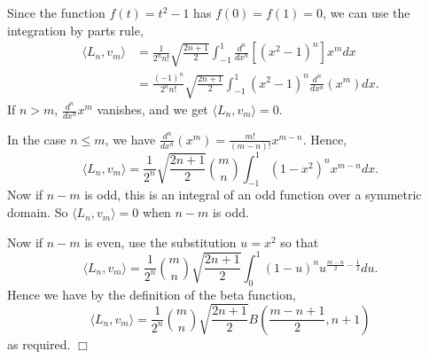 \documentclass[10pt]{article}
\newenvironment{proof}[1][Proof]{\begin{trivlist}
\item[\hskip \labelsep {\bfseries #1}]}{\end{trivlist}}
\begin{document}
        \begin{proof}
            Since the function $f(t) = t^2-1$ has $f(0) = f(1) = 0$, we can use the integration
            by parts rule,
            \begin{align*}
                \langle L_n,v_m\rangle &= \frac{1}{2^nn!}\sqrt{\frac{2n+1}{2}}\int_{-1}^1\frac{d^n}{dx^n}[(x^2-1)^n]x^mdx\\
                &= \frac{(-1)^n}{2^n n!}\sqrt{\frac{2n+1}{2}}\int_{-1}^1(x^2-1)^n\frac{d^n}{dx^n}(x^m)dx.
            \end{align*}
            If $n > m$, $\frac{d^n}{dx^n}x^m$ vanishes, and we get $\langle L_n,v_m\rangle = 0$. 
            
            In the case $n \leq m$, we have $\frac{d^n}{dx^n}(x^m) = \frac{m!}{(m-n)!}x^{m-n}$. Hence,
            \begin{equation*}
                \langle L_n,v_m\rangle = \frac{1}{2^n}\sqrt{\frac{2n+1}{2}}{m\choose n} \int_{-1}^1(1-x^2)^nx^{m-n}dx.
            \end{equation*}
            Now if $n-m$ is odd, this is an integral of an odd function over a symmetric
            domain. So $\langle L_n,v_m\rangle = 0$ when $n-m$ is odd.
            
            Now if $n-m$ is even,  use the substitution $u = x^2$ so that
            \begin{equation*}
                \langle L_n,v_m\rangle = \frac{1}{2^n}{m\choose n}\sqrt{\frac{2n+1}{2}}\int_{0}^1(1-u)^nu^{\frac{m-n}{2}-\frac{1}{2}}du.
            \end{equation*}
            Hence we have by the definition of the beta function,
            \begin{equation*}
                \langle L_n,v_m\rangle = \frac{1}{2^n}{m\choose n}\sqrt{\frac{2n+1}{2}}B(\frac{m-n+1}{2},n+1)
            \end{equation*}
            as required. $\Box$
        \end{proof}
        
\end{document}
